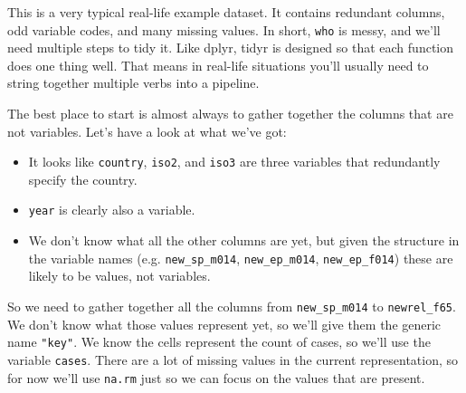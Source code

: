 \documentclass[]{book}
\newenvironment{Shaded}{\begin{snugshade}}{\end{snugshade}}
\newcommand{\KeywordTok}[1]{\textcolor[rgb]{0.13,0.29,0.53}{\textbf{{#1}}}}
\newcommand{\DataTypeTok}[1]{\textcolor[rgb]{0.13,0.29,0.53}{{#1}}}
\newcommand{\StringTok}[1]{\textcolor[rgb]{0.31,0.60,0.02}{{#1}}}
\newcommand{\CommentTok}[1]{\textcolor[rgb]{0.56,0.35,0.01}{\textit{{#1}}}}
\newcommand{\OtherTok}[1]{\textcolor[rgb]{0.56,0.35,0.01}{{#1}}}
\newcommand{\NormalTok}[1]{{#1}}
\begin{document}
This is a very typical real-life example dataset. It contains redundant
columns, odd variable codes, and many missing values. In short,
\texttt{who} is messy, and we'll need multiple steps to tidy it. Like
dplyr, tidyr is designed so that each function does one thing well. That
means in real-life situations you'll usually need to string together
multiple verbs into a pipeline.

The best place to start is almost always to gather together the columns
that are not variables. Let's have a look at what we've got:

\begin{itemize}
\item
  It looks like \texttt{country}, \texttt{iso2}, and \texttt{iso3} are
  three variables that redundantly specify the country.
\item
  \texttt{year} is clearly also a variable.
\item
  We don't know what all the other columns are yet, but given the
  structure in the variable names (e.g. \texttt{new\_sp\_m014},
  \texttt{new\_ep\_m014}, \texttt{new\_ep\_f014}) these are likely to be
  values, not variables.
\end{itemize}

So we need to gather together all the columns from
\texttt{new\_sp\_m014} to \texttt{newrel\_f65}. We don't know what those
values represent yet, so we'll give them the generic name
\texttt{"key"}. We know the cells represent the count of cases, so we'll
use the variable \texttt{cases}. There are a lot of missing values in
the current representation, so for now we'll use \texttt{na.rm} just so
we can focus on the values that are present.

\begin{Shaded}
\end{Shaded}
\end{document}
